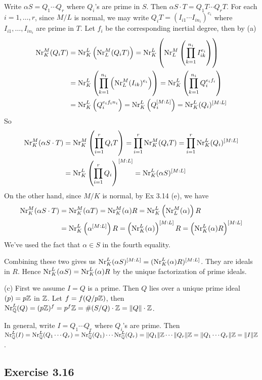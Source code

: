\documentclass[../Marcus.tex]{subfiles}
\begin{document}
Write $\alpha S=Q_1\cdots Q_r$ where $Q_i$'s are prime in $S$. Then $\alpha S\cdot T=Q_1T\cdots Q_rT$. For each $i=1,\ldots,r$, since $M/L$ is normal, we may write $Q_iT=(I_{i1}\cdots I_{in_i})^{e_i}$ where $I_{i1},\ldots,I_{in_i}$ are prime in $T$. Let $f_i$ be the corresponding inertial degree, then by (a)
\begin{align*}
\operatorname{Nr}^M_K(Q_iT) &= \operatorname{Nr}^L_K\left(\operatorname{Nr}^M_L(Q_iT)\right) = \operatorname{Nr}^L_K\left(\operatorname{Nr}^M_L\left(\prod_{k=1}^{n_i} I_{ik}^{e_i}\right)\right) \\
&= \operatorname{Nr}^L_K\left(\prod_{k=1}^{n_i}\left(\operatorname{Nr}^M_L (I_{ik})^{e_i}\right)\right) = \operatorname{Nr}^L_K\left(\prod_{k=1}^{n_i} Q_i^{e_if_i}\right) \\
&= \operatorname{Nr}^L_K\left(Q_i^{e_if_in_i}\right) = \operatorname{Nr}^L_K\left(Q_i^{[M:L]}\right) = \operatorname{Nr}^L_K(Q_i)^{[M:L]}
\end{align*}
So
\begin{align*}
\operatorname{Nr}^M_K(\alpha S\cdot T) &= \operatorname{Nr}^M_K\left(\prod_{i=1}^r Q_iT\right) = \prod_{i=1}^r \operatorname{Nr}^M_K(Q_iT) = \prod_{i=1}^r \operatorname{Nr}^L_K(Q_i)^{[M:L]} \\
&= \operatorname{Nr}^L_K\left(\prod_{i=1}^r Q_i\right)^{[M:L]} = \operatorname{Nr}^L_K(\alpha S)^{[M:L]}
\end{align*}
On the other hand, since $M/K$ is normal, by Ex 3.14 (e), we have
\begin{align*}
\operatorname{Nr}^M_K(\alpha S\cdot T) &= \operatorname{Nr}^M_K(\alpha T) = \operatorname{Nr}^M_K(\alpha)R = \operatorname{Nr}^L_K\left(\operatorname{Nr}^M_L(\alpha)\right)R \\
&= \operatorname{Nr}^L_K\left(\alpha^{[M:L]}\right)R = \left(\operatorname{Nr}^L_K(\alpha)\right)^{[M:L]}R = \left(\operatorname{Nr}^L_K(\alpha)R\right)^{[M:L]} 
\end{align*}
We've used the fact that $\alpha\in S$ in the fourth equality.

Combining these two gives us $\operatorname{Nr}^L_K(\alpha S)^{[M:L]}=(\operatorname{Nr}^L_K(\alpha)R)^{[M:L]}$. They are ideals in $R$. Hence $\operatorname{Nr}^L_K(\alpha S)=\operatorname{Nr}^L_K(\alpha)R$ by the unique factorization of prime ideals.

(c) First we assume $I=Q$ is a prime. Then $Q$ lies over a unique prime ideal $(p)=p\mathbb{Z}$ in $\mathbb{Z}$. Let $f=f(Q/p\mathbb{Z})$, then $\operatorname{Nr}^L_{\mathbb{Q}}(Q)=(p\mathbb{Z})^f=p^f\mathbb{Z}=\#(S/Q)\cdot\mathbb{Z}=\|Q\|\cdot\mathbb{Z}$.

In general, write $I=Q_1\cdots Q_r$ where $Q_i$'s are prime. Then $\operatorname{Nr}^L_{\mathbb{Q}}(I)=\operatorname{Nr}^L_{\mathbb{Q}}(Q_1\cdots Q_r)=\operatorname{Nr}^L_{\mathbb{Q}}(Q_1)\cdots\operatorname{Nr}^L_{\mathbb{Q}}(Q_r)=\|Q_1\|\mathbb{Z}\cdots\|Q_r\|\mathbb{Z}=\|Q_1\cdots Q_r\|\mathbb{Z}=\|I\|\mathbb{Z}$.

\subsection*{Exercise 3.16}
\end{document}
